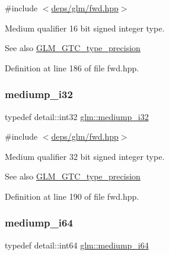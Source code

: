 {\ttfamily \#include $<$\hyperlink{fwd_8hpp}{deps/glm/fwd.\+hpp}$>$}

Medium qualifier 16 bit signed integer type. \begin{DoxySeeAlso}{See also}
\hyperlink{group__gtc__type__precision}{G\+L\+M\+\_\+\+G\+T\+C\+\_\+type\+\_\+precision} 
\end{DoxySeeAlso}


Definition at line 186 of file fwd.\+hpp.

\mbox{\label{group__gtc__type__precision_ga5e00ec824eb55968a6b6496f294d8c07}} 
\subsubsection{\texorpdfstring{mediump\+\_\+i32}{mediump\_i32}}
{\footnotesize\ttfamily typedef detail\+::int32 \hyperlink{group__gtc__type__precision_ga5e00ec824eb55968a6b6496f294d8c07}{glm\+::mediump\+\_\+i32}}



{\ttfamily \#include $<$\hyperlink{fwd_8hpp}{deps/glm/fwd.\+hpp}$>$}

Medium qualifier 32 bit signed integer type. \begin{DoxySeeAlso}{See also}
\hyperlink{group__gtc__type__precision}{G\+L\+M\+\_\+\+G\+T\+C\+\_\+type\+\_\+precision} 
\end{DoxySeeAlso}


Definition at line 190 of file fwd.\+hpp.

\mbox{\label{group__gtc__type__precision_ga90fedf6c701ffbe00535156715e50787}} 
\subsubsection{\texorpdfstring{mediump\+\_\+i64}{mediump\_i64}}
{\footnotesize\ttfamily typedef detail\+::int64 \hyperlink{group__gtc__type__precision_ga90fedf6c701ffbe00535156715e50787}{glm\+::mediump\+\_\+i64}}



